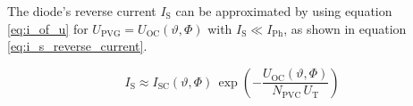 The diode's reverse current $I_\mathrm{S}$ can be approximated by using equation \ref{eq:i_of_u} for $U_\mathrm{PVG} = U_\mathrm{OC}\left(\vartheta,\Phi\right)$ with $I_{\mathrm{S}} \ll I_{\mathrm{Ph}}$, as shown in equation \ref{eq:i_s_reverse_current}.
\begin{center}
	\begin{equation} \label{eq:i_s_reverse_current}
		 I_\mathrm{S} \approx I_{\mathrm{SC}}\left(\vartheta,\Phi\right) \, \exp \left( - \frac{U_{\mathrm{OC}}\left(\vartheta,\Phi\right)}{N_\mathrm{PVC} \, U_\mathrm{T}} \right)
	\end{equation}
\end{center}


